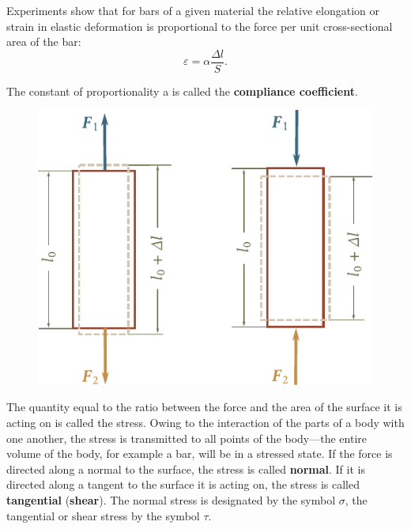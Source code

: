 Experiments show that for bars of a given material the relative elongation or strain in elastic deformation is proportional to the force per unit cross-sectional area of the bar:
\begin{equation}\label{eq:2_28}
\varepsilon = \alpha\frac{\Delta l}{S}.
\end{equation}

\noindent
The constant of proportionality a is called the \textbf{compliance coefficient}.

\begin{figure}[t]
	\begin{center}
		\includegraphics[scale=0.95]{figures/ch_02/fig_2_6.pdf}
		\caption[]{}
		\label{fig:2_6}
	\end{center}
	\vspace{-0.7cm}
\end{figure}

The quantity equal to the ratio between the force and the area of the surface it is acting on is called the stress. Owing to the interaction of the parts of a body with one another, the stress is transmitted to all points of the body---the entire volume of the body, for example a bar, will be in a stressed state. If the force is directed along a normal to the surface, the stress is called \textbf{normal}. If it is directed along a tangent to the surface it is acting on, the stress is called \textbf{tangential} (\textbf{shear}). The normal stress is designated by the symbol $\sigma$, the tangential or shear stress by the symbol $\tau$.

